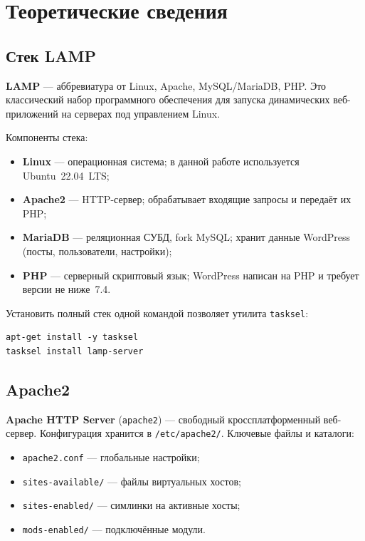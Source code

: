 \chapter{Теоретические сведения}
\label{ch:theory}

\section{Стек LAMP}

\textbf{LAMP} --- аббревиатура от Linux, Apache, MySQL/MariaDB, PHP.
Это классический набор программного обеспечения для запуска динамических
веб-приложений на серверах под управлением Linux.

Компоненты стека:
\begin{itemize}
  \item \textbf{Linux} --- операционная система; в данной работе
        используется Ubuntu~22.04~LTS;
  \item \textbf{Apache2} --- HTTP-сервер; обрабатывает входящие
        запросы и передаёт их PHP;
  \item \textbf{MariaDB} --- реляционная СУБД, fork MySQL;
        хранит данные WordPress (посты, пользователи, настройки);
  \item \textbf{PHP} --- серверный скриптовый язык; WordPress
        написан на PHP и требует версии не ниже~7.4.
\end{itemize}

Установить полный стек одной командой позволяет утилита
\texttt{tasksel}:
\begin{lstlisting}
apt-get install -y tasksel
tasksel install lamp-server
\end{lstlisting}

\section{Apache2}

\textbf{Apache HTTP Server} (\texttt{apache2}) --- свободный
кроссплатформенный веб-сервер. Конфигурация хранится в
\texttt{/etc/apache2/}. Ключевые файлы и каталоги:
\begin{itemize}
  \item \texttt{apache2.conf} --- глобальные настройки;
  \item \texttt{sites-available/} --- файлы виртуальных хостов;
  \item \texttt{sites-enabled/} --- симлинки на активные хосты;
  \item \texttt{mods-enabled/} --- подключённые модули.
\end{itemize}

